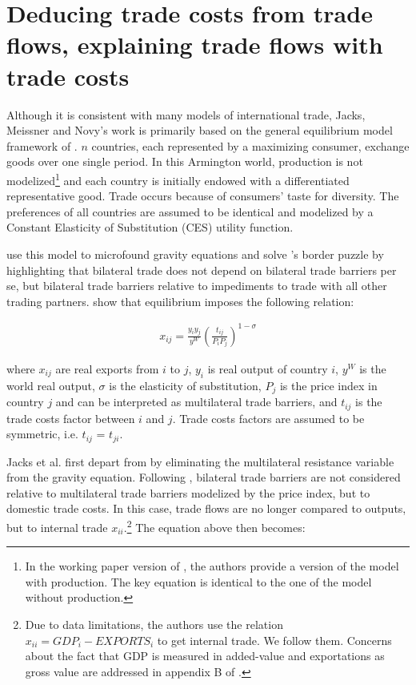 \documentclass{article}
\begin{document}
\section{\label{1} Deducing trade costs from trade flows, explaining trade flows with trade costs}

Although it is consistent with many models of international
trade, Jacks, Meissner and Novy's work is primarily based on
the general equilibrium model framework of \cite{AW2003}. $n$
countries, each represented by a maximizing consumer, exchange
goods over one single period. In this Armington world,
production is not modelized\footnote{In the working paper
version of \cite{JMN2010}, the authors provide a version of the
model with production. The key equation is identical to the one
of the model without production.} and each country is initially
endowed with a differentiated representative good. Trade occurs
because of consumers' taste for diversity. The preferences of
all countries are assumed to be identical and modelized by a
Constant Elasticity of Substitution (CES) utility function.

\cite{AW2003} use this model to microfound gravity equations
and solve \cite{MAC}'s border puzzle by highlighting that
bilateral trade does not depend on bilateral trade barriers per
se, but bilateral trade barriers relative to impediments to
trade with all other trading partners. \cite{AW2003} show that
equilibrium imposes the following relation:

\begin{eqnarray}
x_{ij}=\frac{y_i y_j}{y^W}\left(\frac{t_{ij}}{P_i P_j}\right)^{1-\sigma}
\end{eqnarray}

where $x_{ij}$ are real exports from $i$ to $j$, $y_i$ is real
output of country $i$, $y^W$ is the world real output, $\sigma$
is the elasticity of substitution, $P_j$ is the price index in
country $j$ and can be interpreted as multilateral trade
barriers, and $t_{ij}$ is the trade costs factor between $i$
and $j$. Trade costs factors are assumed to be symmetric, i.e.
$t_{ij}$ = $t_{ji}$.

Jacks et al. first depart from \cite{AW2003} by eliminating the
multilateral resistance variable from the gravity equation.
Following \cite{NOVY}, bilateral trade barriers are not
considered relative to multilateral trade barriers modelized by
the price index, but to domestic trade costs. In this case,
trade flows are no longer compared to outputs, but to internal
trade $x_{ii}$.\footnote{Due to data limitations, the authors
use the relation $x_{ii}=GDP_i-EXPORTS_i$ to get internal
trade. We follow them. Concerns about the fact that GDP is
measured in added-value and exportations as gross value are
addressed in appendix B of \cite{JMN2011}.} The equation above
then becomes:
\end{document}
